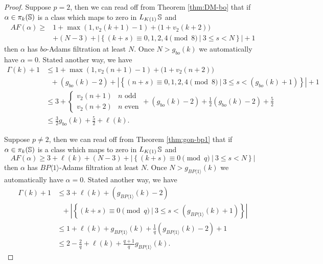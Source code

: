 \begin{proof}
  Suppose $p=2$, then we can read off from Theorem \ref{thm:DM-bo} that
  if $\alpha \in \pi_k(\operatorname{\mathbb{S}})$ is a class which maps to zero in $L_{K(1)}\operatorname{\mathbb{S}}$ and
  \begin{align*}
    AF(\alpha) \geq &1 + \max(1, v_2(k+1)-1) + \big( 1 + v_2(k+2) \big) \\
    &+ (N-3) + \left| \left\{ (k+s) \equiv 0,1,2,4 \pmod 8\ |\ 3 \leq s < N \right\} \right| + 1
  \end{align*}
  then $\alpha$ has $bo$-Adams filtration at least $N$.
  Once $N > g_{bo}(k)$ we automatically have $\alpha = 0$.
  Stated another way, we have
  \begin{align*}
    \Gamma(k)+1 &\leq 1 + \max(1, v_2(n+1)-1) + \big( 1 + v_2(n+2) \big) \\
    &\ \ \ + (g_{bo}(k) - 2) + \left| \left\{ (n+s) \equiv 0,1,2,4 \pmod 8\ |\ 3 \leq s < (g_{bo}(k)+1) \right\} \right| + 1 \\
    &\leq 3 + \begin{cases} v_2(n+1) & n \text{ odd} \\ v_2(n+2) & n \text{ even} \end{cases} + (g_{bo}(k) - 2) + \frac{1}{2}(g_{bo}(k) - 2) + \frac{5}{2} \\
    &\leq \frac{3}{2}g_{bo}(k) + \frac{5}{2} + \ell(k).
\end{align*}

  Suppose $p \neq 2$, then we can read off from Theorem \ref{thm:gon-bp1} that
  if $\alpha \in \pi_k(\operatorname{\mathbb{S}})$ is a class which maps to zero in $L_{K(1)}\operatorname{\mathbb{S}}$ and
  $$ AF(\alpha) \geq 3 + \ell(k) + (N-3) + \left| \left\{ (k+s) \equiv 0 \pmod q\ |\ 3 \leq s < N \right\} \right| $$
  then $\alpha$ has $BP\langle 1 \rangle$-Adams filtration at least $N$.
  Once $N > g_{BP\langle 1 \rangle}(k)$ we automatically have $\alpha = 0$.
  Stated another way, we have
  \begin{align*}
    \Gamma(k)+1 &\leq 3 + \ell(k) + (g_{BP\langle 1 \rangle}(k)-2) \\
    &\ \ \ + \left| \left\{ (k+s) \equiv 0 \pmod q\ |\ 3 \leq s < (g_{BP\langle 1 \rangle}(k)+1) \right\} \right| \\
    &\leq 1 + \ell(k) + g_{BP\langle 1 \rangle}(k) + \frac{1}{q}(g_{BP\langle 1 \rangle}(k) - 2) + 1 \\
    &\leq 2 - \frac{2}{q} + \ell(k) + \frac{q+1}{q} g_{BP\langle 1 \rangle}(k).
  \end{align*}
\end{proof}

